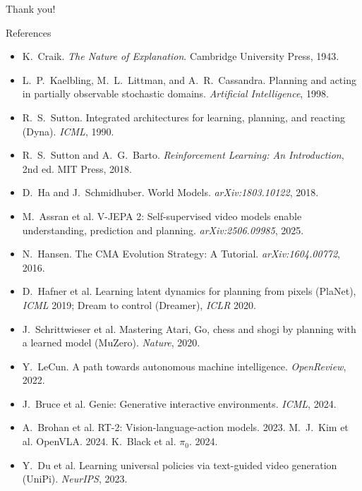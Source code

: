 \documentclass[xcolor=dvipsnames,aspectratio=169]{beamer}
\begin{document}
\begin{frame}
    \centering
    {\Huge Thank you!}

\end{frame}

\begin{frame}{References}
    \tiny
    \begin{itemize}
        \item K.~Craik. \emph{The Nature of Explanation}. Cambridge University Press, 1943.
        \item L.~P.~Kaelbling, M.~L.~Littman, and A.~R.~Cassandra. Planning and acting in partially observable stochastic domains. \emph{Artificial Intelligence}, 1998.
        \item R.~S.~Sutton. Integrated architectures for learning, planning, and reacting (Dyna). \emph{ICML}, 1990.
        \item R.~S.~Sutton and A.~G.~Barto. \emph{Reinforcement Learning: An Introduction}, 2nd ed. MIT Press, 2018.
        \item D.~Ha and J.~Schmidhuber. World Models. \emph{arXiv:1803.10122}, 2018.
        \item M.~Assran et al. V-JEPA 2: Self-supervised video models enable understanding, prediction and planning. \emph{arXiv:2506.09985}, 2025.
        \item N.~Hansen. The CMA Evolution Strategy: A Tutorial. \emph{arXiv:1604.00772}, 2016.
        \item D.~Hafner et al. Learning latent dynamics for planning from pixels (PlaNet), \emph{ICML} 2019; Dream to control (Dreamer), \emph{ICLR} 2020.
        \item J.~Schrittwieser et al. Mastering Atari, Go, chess and shogi by planning with a learned model (MuZero). \emph{Nature}, 2020.
        \item Y.~LeCun. A path towards autonomous machine intelligence. \emph{OpenReview}, 2022.
        \item J.~Bruce et al. Genie: Generative interactive environments. \emph{ICML}, 2024.
        \item A.~Brohan et al. RT-2: Vision-language-action models. 2023. \quad M.~J.~Kim et al. OpenVLA. 2024. \quad K.~Black et al. $\pi_0$. 2024.
        \item Y.~Du et al. Learning universal policies via text-guided video generation (UniPi). \emph{NeurIPS}, 2023.

\end{itemize}
\end{frame}
\end{document}
